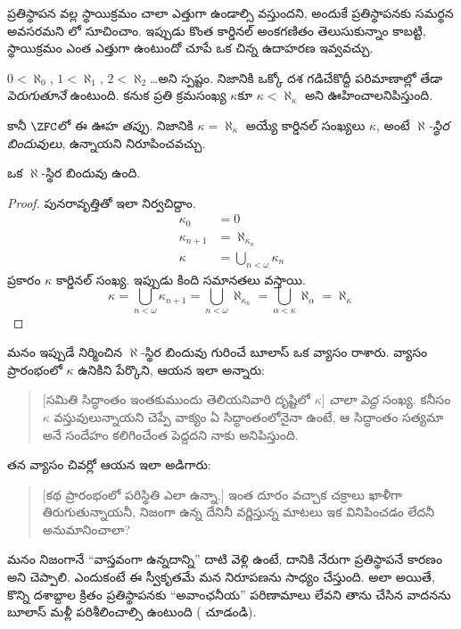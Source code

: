 \documentclass[../../../include/open-logic-section]{subfiles}
\begin{document}

ప్రతిస్థాపన వల్ల స్థాయిక్రమం చాలా ఎత్తుగా ఉండాల్సి
వస్తుందని, అందుకే ప్రతిస్థాపనకు సమర్థన అవసరమని
లో సూచించాం. ఇప్పుడు కొంత
కార్డినల్ అంకగణితం తెలుసుకున్నాం కాబట్టి, స్థాయిక్రమం
ఎంత ఎత్తుగా ఉంటుందో చూపే ఒక చిన్న ఉదాహరణ ఇవ్వవచ్చు.

$0 < \aleph_0$, $1 < \aleph_1$, $2 < \aleph_2$\ldots అని స్పష్టం. నిజానికి ఒక్కో దశ గడిచేకొద్దీ పరిమాణాల్లో తేడా \emph{పెరుగుతూనే} ఉంటుంది. కనుక ప్రతి క్రమసంఖ్య $\kappa$కూ $\kappa< \aleph_\kappa$ అని ఊహించాలనిపిస్తుంది.

కానీ $\ZFC$లో ఈ ఊహ \emph{తప్పు}. నిజానికి $\kappa=\aleph_\kappa$ అయ్యే కార్డినల్ సంఖ్యలు $\kappa$, అంటే \emph{$\aleph$-స్థిర బిందువులు}, ఉన్నాయని నిరూపించవచ్చు.

\begin{prop}
ఒక $\aleph$-స్థిర బిందువు ఉంది.
\end{prop}

\begin{proof}
పునరావృత్తితో ఇలా నిర్వచిద్దాం.
\begin{align*}
	\kappa_0 &= 0\\
	\kappa_{n+1} &= \aleph_{\kappa_n}\\
	\kappa&= \bigcup_{n < \omega}\kappa_n
\end{align*}
 ప్రకారం $\kappa$ కార్డినల్ సంఖ్య. ఇప్పుడు కింది సమానతలు వస్తాయి.
\[
	\kappa= \bigcup_{n < \omega} \kappa_{n+1} = 
	\bigcup_{n < \omega}\aleph_{\kappa_n} = 
	\bigcup_{\alpha < \kappa}\aleph_\alpha = \aleph_\kappa
\]
\end{proof}

మనం ఇప్పుడే నిర్మించిన $\aleph$-స్థిర బిందువు గురించే బూలాస్ ఒక వ్యాసం రాశారు. వ్యాసం ప్రారంభంలో $\kappa$ ఉనికిని పేర్కొని, ఆయన ఇలా అన్నారు:
\begin{quote}
	[సమితి సిద్ధాంతం ఇంతకుముందు తెలియనివారి దృష్టిలో $\kappa$] \emph{చాలా పెద్ద} సంఖ్య. కనీసం $\kappa$ వస్తువులున్నాయని చెప్పే వాక్యం ఏ సిద్ధాంతంలోనైనా ఉంటే, ఆ సిద్ధాంతం సత్యమా అనే సందేహం కలిగించేంత పెద్దదని నాకు అనిపిస్తుంది.
	\citep[p.~257]{Boolos2000}
\end{quote}
తన వ్యాసం చివర్లో ఆయన ఇలా అడిగారు:
\begin{quote}
	[కథ ప్రారంభంలో పరిస్థితి ఎలా ఉన్నా,] ఇంత దూరం వచ్చాక చక్రాలు ఖాళీగా తిరుగుతున్నాయనీ, నిజంగా ఉన్న దేనినీ వర్ణిస్తున్న మాటలు ఇక వినిపించడం లేదనీ అనుమానించాలా?
	\citep[p.~268]{Boolos2000}
\end{quote}
మనం నిజంగానే ``వాస్తవంగా ఉన్నదాన్ని'' దాటి వెళ్లి ఉంటే, దానికి నేరుగా ప్రతిస్థాపనే కారణం అని చెప్పాలి. ఎందుకంటే ఈ స్వీకృతమే మన నిరూపణను సాధ్యం చేస్తుంది. అలా అయితే, కొన్ని దశాబ్దాల క్రితం ప్రతిస్థాపనకు ``అవాంఛనీయ'' పరిణామాలు లేవని తాను చేసిన వాదనను బూలాస్ మళ్లీ పరిశీలించాల్సి ఉంటుంది ( చూడండి).
\end{document}
